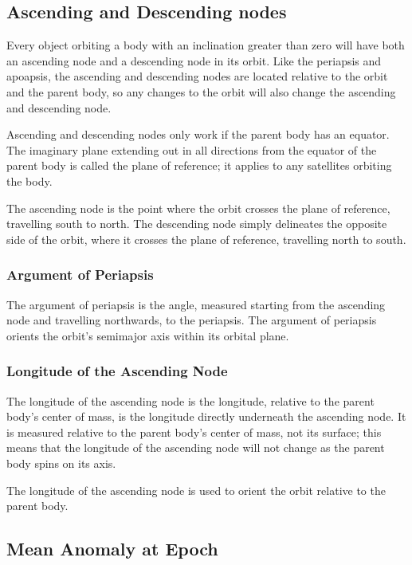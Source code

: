 \documentclass[oneside,a5paper]{book}
\begin{document}
\subsection{Ascending and Descending nodes}

Every object orbiting a body with an inclination greater than zero
will have both an ascending node and a descending node in its
orbit. Like the periapsis and apoapsis, the ascending and descending
nodes are located relative to the orbit and the parent body, so any
changes to the orbit will also change the ascending and descending
node.

Ascending and descending nodes only work if the parent body has an
equator. The imaginary plane extending out in all directions from the
equator of the parent body is called the plane of reference; it
applies to any satellites orbiting the body.

The ascending node is the point where the orbit crosses the plane of
reference, travelling south to north. The descending node simply
delineates the opposite side of the orbit, where it crosses the plane
of reference, travelling north to south.

\subsubsection{Argument of Periapsis}

The argument of periapsis is the angle, measured starting from the
ascending node and travelling northwards, to the periapsis. The
argument of periapsis orients the orbit’s semimajor axis within its
orbital plane.

\subsubsection{Longitude of the Ascending Node}

The longitude of the ascending node is the longitude, relative to the
parent body’s center of mass, is the longitude directly underneath the
ascending node. It is measured relative to the parent body’s center of
mass, not its surface; this means that the longitude of the ascending
node will not change as the parent body spins on its axis.

The longitude of the ascending node is used to orient the orbit
relative to the parent body.

\subsection{Mean Anomaly at Epoch}
\end{document}
